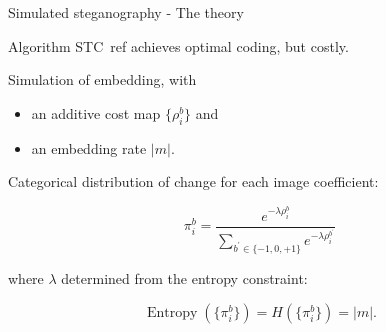 \documentclass[10pt]{beamer}
\begin{document}



\begin{frame}{Simulated steganography - The theory}

Algorithm STC~ref achieves optimal coding, but costly.

\pause



Simulation of embedding, with
\begin{itemize}
    \item an additive cost map $\{\rho_i^b\}$ and 
    \item an embedding rate $|m|$. 
\end{itemize}

\pause 

Categorical distribution of change for each image coefficient:

\begin{equation}
\pi_{i}^b =\frac{e^{-\lambda \rho_{i}^{b}}}{\sum_{b^{\prime} \in \{-1,0,+1\}} e^{-\lambda \rho_{i}^{b^{\prime}}}}
\end{equation}

where $\lambda$ determined from the entropy constraint:

\begin{equation}
\operatorname{Entropy}(\{\pi_i^b\}) = H(\{\pi_i^b\}) = |m|.
\end{equation}



\end{frame}
\end{document}
